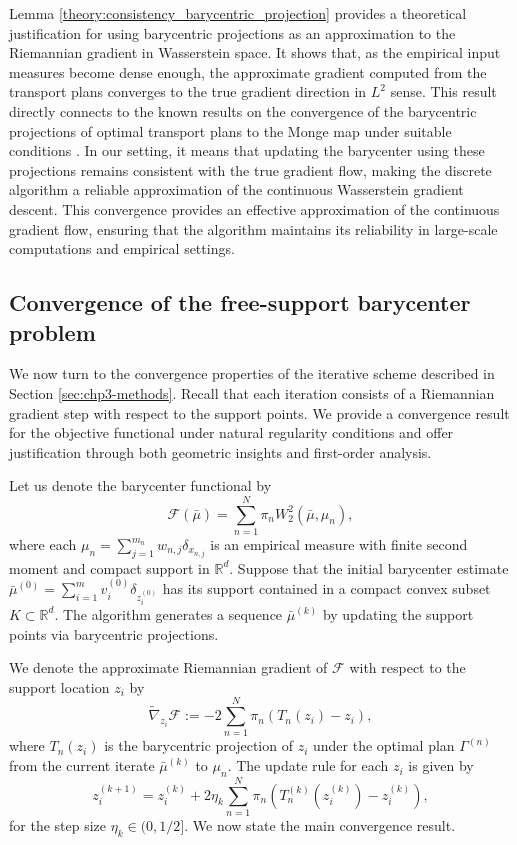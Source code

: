 \documentclass[11pt]{article}
\newcommand{\bbR}{\mathbb{R}}
\newcommand{\calF}{\mathcal{F}}
\newcommand{\barmu}{\bar{\mu}}
\begin{document}
Lemma \ref{theory:consistency_barycentric_projection} provides a theoretical justification for using barycentric projections as an approximation to the Riemannian gradient in Wasserstein space. It shows that, as the empirical input measures become dense enough, the approximate gradient computed from the transport plans converges to the true gradient direction in $L^2$ sense. This result directly connects to the known results on the convergence of the barycentric projections of optimal transport plans to the Monge map under suitable conditions \citep{peyre_2019_ComputationalOptimalTransport}. In our setting, it means that updating the barycenter using these projections remains consistent with the true gradient flow, making the discrete algorithm a reliable approximation of the continuous Wasserstein gradient descent. This convergence provides an effective approximation of the continuous gradient flow, ensuring that the algorithm maintains its reliability in large-scale computations and empirical settings. 

\subsection{Convergence of the free-support barycenter problem}

We now turn to the convergence properties of the iterative scheme described in Section \ref{sec:chp3-methods}. Recall that each iteration consists of a Riemannian gradient step with respect to the support points. We provide a convergence result for the objective functional under natural regularity conditions and offer justification through both geometric insights and first-order analysis.

Let us denote the barycenter functional by 
\begin{equation*}
    \calF(\bar{\mu}) = \sum_{n=1}^N \pi_n W_2^2(\bar{\mu}, \mu_n),
\end{equation*}
where each $\mu_n = \sum_{j=1}^{m_n} w_{n,j} \delta_{x_{n,j}}$ is an empirical measure with finite second moment and compact support in $\bbR^d$. Suppose that the initial barycenter estimate $\bar{\mu}^{(0)} = \sum_{i=1}^m v_i^{(0)} \delta_{z_i^{(0)}}$ has its support contained in a compact convex subset $K \subset\bbR^d$. The algorithm generates a sequence $\bar{\mu}^{(k)}$ by updating the support points via barycentric projections.

We denote the approximate Riemannian gradient of $\calF$ with respect to the support location $z_i$ by 
\begin{equation*}
    \tilde{\nabla}_{z_i}\calF := -2 \sum_{n=1}^N \pi_n (T_n(z_i)-z_i),
\end{equation*}
where $T_n(z_i)$ is the barycentric projection of $z_i$ under the optimal plan $\Gamma^{(n)}$ from the current iterate $\barmu^{(k)}$ to $\mu_n$. The update rule for each $z_i$ is given by 
\begin{equation*}
    z_i^{(k+1)} = z_i^{(k)} + 2\eta_k \sum_{n=1}^N \pi_n (T_n^{(k)} (z_i^{(k)}) - z_i^{(k)}),
\end{equation*}
for the step size $\eta_k \in (0, 1/2]$. We now state the main convergence result.
\end{document}
